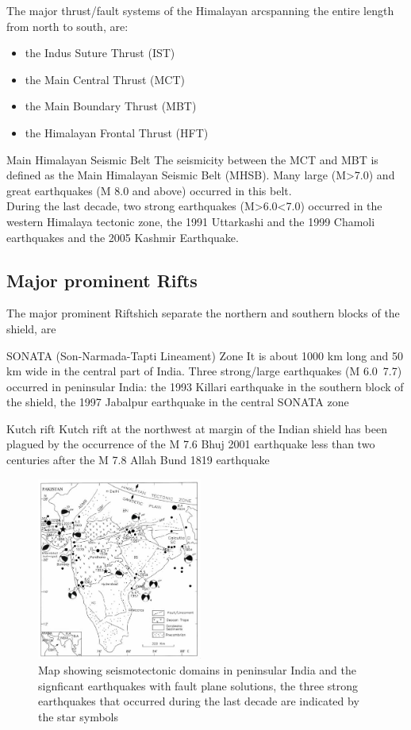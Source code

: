 \documentclass[smaller]{beamer}
\begin{document}
\begin{frame}{The major thrust/fault systems of the Himalayan arc}{spanning the entire
length from north to south, are:}
\begin{itemize}
	\item the Indus Suture Thrust (IST)
	\item the Main Central Thrust (MCT)
	\item the Main Boundary Thrust (MBT)
	\item the Himalayan Frontal Thrust (HFT)
\end{itemize}
\begin{block}{Main Himalayan Seismic Belt}
The seismicity between the MCT
and MBT is defined as the Main Himalayan Seismic Belt
(MHSB).
Many large (M>7.0) and great earthquakes
(M 8.0 and above) occurred in this belt.\\
During the last decade, two strong earthquakes
(M>6.0<7.0) occurred in the western Himalaya tectonic
zone, the 1991 Uttarkashi and the 1999 Chamoli
earthquakes and the 2005 Kashmir Earthquake.
\end{block}
\end{frame}
\subsection{Major prominent Rifts}
\begin{frame}{The major prominent Rifts}{hich separate the northern and southern blocks of the shield, are}
  \begin{block}{SONATA (Son-Narmada-Tapti Lineament) Zone}
	It is about 1000 km long and 50 km wide in the central part of India.
Three strong/large earthquakes (M 6.0~7.7) occurred in peninsular India: the 1993 Killari
earthquake in the southern block of the shield, the 1997
Jabalpur earthquake in the central SONATA zone
	\end{block}
	\begin{block}{Kutch rift}
	Kutch rift at the northwest at margin of the Indian shield has been plagued by the occurrence of the M 7.6 Bhuj 2001
earthquake less than two centuries after the M 7.8 Allah Bund 1819 earthquake
	\end{block}
\end{frame}
\begin{frame}
\begin{figure}
\includegraphics[height=6cm]{flmap.png}
\caption{Map showing seismotectonic domains in peninsular India and the signficant earthquakes with fault plane solutions, the three strong
earthquakes that occurred during the last decade are indicated by the star symbols}
\end{figure}
\end{frame}
\end{document}
